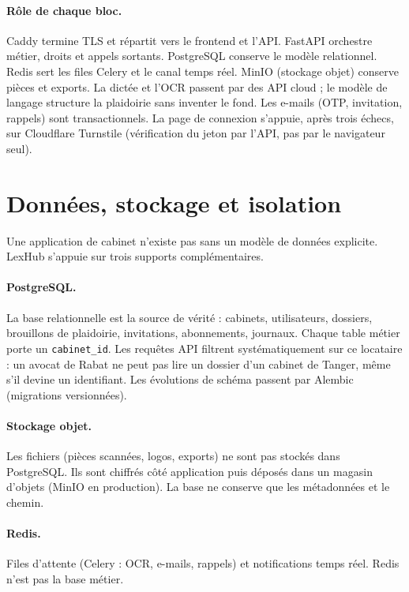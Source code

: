 \paragraph{Rôle de chaque bloc.}
Caddy termine TLS et répartit vers le frontend et l'API. FastAPI orchestre métier, droits et appels sortants. PostgreSQL conserve le modèle relationnel. Redis sert les files Celery et le canal temps réel. MinIO (stockage objet) conserve pièces et exports. La dictée et l'OCR passent par des API cloud ; le modèle de langage structure la plaidoirie sans inventer le fond. Les e-mails (OTP, invitation, rappels) sont transactionnels. La page de connexion s'appuie, après trois échecs, sur Cloudflare Turnstile (vérification du jeton par l'API, pas par le navigateur seul).

\section{Données, stockage et isolation}
\label{sec:bdd}

Une application de cabinet n'existe pas sans un modèle de données explicite. LexHub s'appuie sur trois supports complémentaires.

\paragraph{PostgreSQL.}
La base relationnelle est la source de vérité : cabinets, utilisateurs, dossiers, brouillons de plaidoirie, invitations, abonnements, journaux. Chaque table métier porte un \texttt{cabinet\_id}. Les requêtes API filtrent systématiquement sur ce locataire : un avocat de Rabat ne peut pas lire un dossier d'un cabinet de Tanger, même s'il devine un identifiant. Les évolutions de schéma passent par Alembic (migrations versionnées).

\paragraph{Stockage objet.}
Les fichiers (pièces scannées, logos, exports) ne sont pas stockés dans PostgreSQL. Ils sont chiffrés côté application puis déposés dans un magasin d'objets (MinIO en production). La base ne conserve que les métadonnées et le chemin.

\paragraph{Redis.}
Files d'attente (Celery : OCR, e-mails, rappels) et notifications temps réel. Redis n'est pas la base métier.

